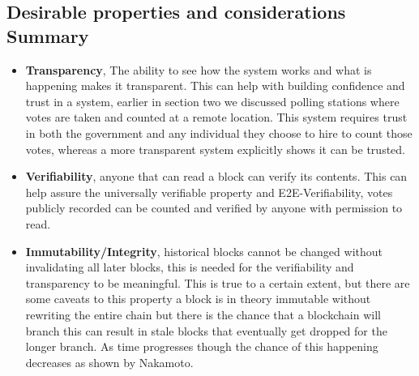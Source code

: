 \documentclass{llncs}
\begin{document}
\subsection{Desirable properties and considerations Summary}

\begin{itemize}
    \item \textbf{Transparency}, The ability to see how the system works and what is happening makes it transparent. This can help with building confidence and trust in a system\cite{moura2017blockchain}, earlier in section two we discussed polling stations where votes are taken and counted at a remote location. This system requires trust in both the government and any individual they choose to hire to count those votes, whereas a more transparent system explicitly shows it can be trusted.
    \item \textbf{Verifiability}, anyone that can read a block can verify its contents. This can help assure the universally verifiable property and E2E-Verifiability, votes publicly recorded can be counted and verified by anyone with permission to read.
    \item \textbf{Immutability/Integrity}, historical blocks cannot be changed without invalidating all later blocks, this is needed for the verifiability and transparency to be meaningful. This is true to a certain extent, but there are some caveats to this property a block is in theory immutable without rewriting the entire chain but there is the chance that a blockchain will branch this can result in stale blocks that eventually get dropped for the longer branch. As time progresses though the chance of this happening decreases as shown by Nakamoto\cite{BTCWhitepaper}.


\end{itemize}
\end{document}
